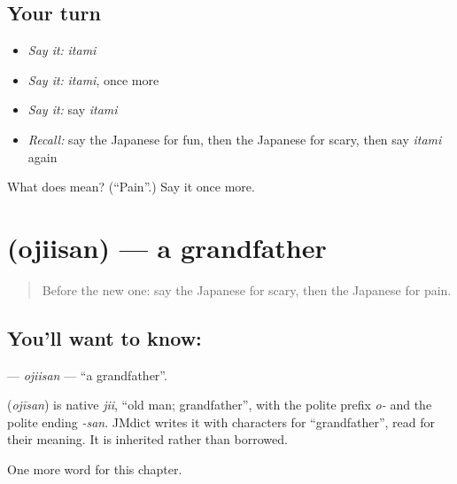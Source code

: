 \subsection*{Your turn}
\begin{itemize}
\raggedright
  \item \emph{Say it:} \emph{itami}
  \item \emph{Say it:} \emph{itami}, once more
  \item \emph{Say it:} say \emph{itami}
  \item \emph{Recall:} say the Japanese for fun, then the Japanese for scary, then say \emph{itami} again
\end{itemize}

\begin{tcolorbox}[breakable,colback=teal!4,colframe=teal!35!black,title={Before you move on}]
What does  mean? (\textquotedblleft{}Pain\textquotedblright{}.) Say it once more.
\end{tcolorbox}
\section[\texorpdfstring{\ja{おじいさん} (ojiisan)}{おじいさん (ojiisan)}]{ (ojiisan) — a grandfather}

\label{lesson:JA-C24-ojiisan}



\begin{quote}
Before the new one: say the Japanese for scary, then the Japanese for pain.
\end{quote}

\subsection*{You'll want to know: }
\textbf{} — \emph{ojiisan} — \textquotedblleft{}a grandfather\textquotedblright{}.

\begin{cousinweb}
\textbf{} (\emph{ojīsan}) is native \emph{jii}, \textquotedblleft{}old man; grandfather\textquotedblright{}, with the polite prefix \emph{o-} and the polite ending \emph{-san}. JMdict writes it with characters for \textquotedblleft{}grandfather\textquotedblright{}, read for their meaning. It is inherited rather than borrowed.
\end{cousinweb}

\begin{grammarlens}[title={What you've built}]
One more word for this chapter.
\end{grammarlens}

